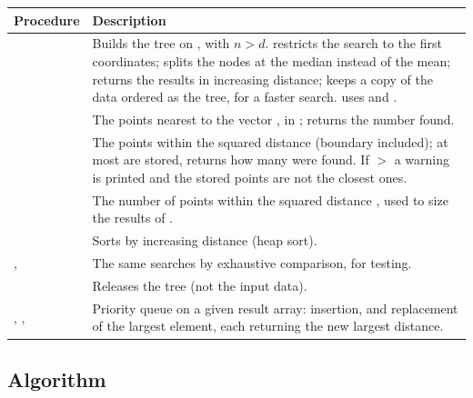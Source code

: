 \begin{longtable}{L{5.8cm} L{8.2cm}}
  \toprule
  \textbf{Procedure} & \textbf{Description} \\
  \midrule
  \endhead
  \bottomrule
  \endfoot
   &
    Builds the tree on , with $n > d$. 
    restricts the search to the first  coordinates;
     splits the nodes at the median instead of the mean;
     returns the results in increasing distance;
     keeps a copy of the data ordered as the tree, for a
    faster search.  uses  and
    . \\
   &
    The  points nearest to the vector , in
    ;  returns the number found. \\
   &
    The points within the squared distance  (boundary included);
    at most  are stored,  returns how many were
    found. If  $>$  a warning is printed and the
    stored points are not the closest ones. \\
   &
    The number of points within the squared distance , used to
    size the results of . \\
   &
    Sorts  by increasing distance (heap sort). \\
  ,
   &
    The same searches by exhaustive comparison, for testing. \\
   &
    Releases the tree (not the input data). \\
  , ,  &
    Priority queue on a given result array: insertion, and replacement of
    the largest element, each returning the new largest distance. \\
\end{longtable}

\subsection{Algorithm}

